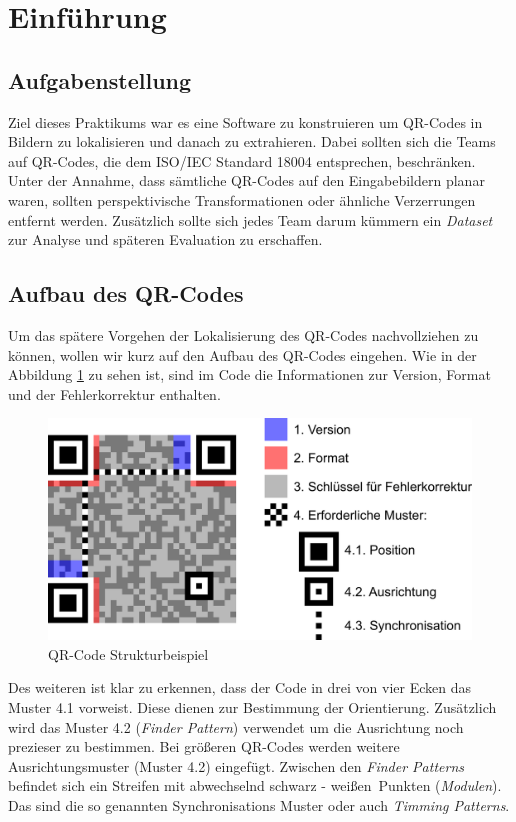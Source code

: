 \section{Einführung}
\subsection{Aufgabenstellung}
Ziel dieses Praktikums war es eine Software zu konstruieren um QR-Codes in Bildern zu lokalisieren und danach zu extrahieren.
Dabei sollten sich die Teams auf QR-Codes, die dem ISO/IEC Standard 18004 entsprechen, beschränken.
Unter der Annahme, dass sämtliche QR-Codes auf den Eingabebildern planar waren, sollten perspektivische Transformationen oder ähnliche Verzerrungen entfernt werden.
Zusätzlich sollte sich jedes Team darum kümmern ein \emph{Dataset} zur Analyse und späteren Evaluation zu erschaffen.
 
\subsection{Aufbau des QR-Codes}
Um das spätere Vorgehen der Lokalisierung des QR-Codes nachvollziehen zu können, wollen wir kurz auf den Aufbau des QR-Codes eingehen.
Wie in der Abbildung \ref{fig:struktur-qrcode} zu sehen ist, sind im Code die Informationen zur Version, Format und der Fehlerkorrektur enthalten. 

\begin{figure}[h]
\label{fig:struktur-qrcode}\caption{QR-Code Strukturbeispiel}
\centering
\includegraphics[scale=0.3]{images/QR_Code_Struktur_Beispiel.png}
\end{figure}

Des weiteren ist klar zu erkennen, dass der Code in drei von vier Ecken das Muster 4.1 vorweist. Diese dienen zur Bestimmung der Orientierung. Zusätzlich wird das Muster 4.2 (\emph{Finder Pattern}) verwendet um die Ausrichtung noch prezieser zu bestimmen. Bei größeren QR-Codes werden weitere Ausrichtungsmuster (Muster 4.2) eingefügt. Zwischen den \emph{Finder Patterns} befindet sich ein Streifen mit abwechselnd \glqq schwarz - weißen\grqq\  Punkten (\emph{Modulen}). Das sind die so genannten Synchronisations Muster oder auch \emph{Timming Patterns}.\\

